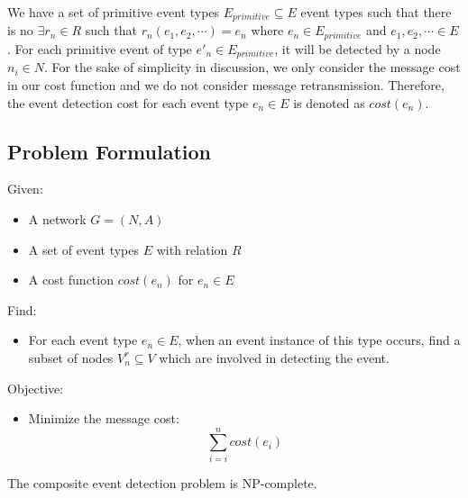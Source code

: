 We have a set of primitive event types \(E_{primitive}\subseteq E\) event types such that there is no \(\exists r_n\in R\) such that \(r_n(e_1, e_2, \cdots)=e_n\) where \(e_n\in E_{primitive}\) and \(e_1, e_2, \cdots \in E\). For each primitive event of type \(e'_n\in E_{primitive}\), it will be detected by a node \(n_i\in N\). For the sake of simplicity in discussion, we only consider the message cost in our cost function and we do not consider message retransmission. Therefore, the event detection cost for each event type \(e_n\in E\) is denoted as \(cost(e_n)\).

\subsection{Problem Formulation}
Given:
\begin{itemize}
	\item A network \(G=(N, A)\)
	\item A set of event types \(E\) with relation \(R\)
	\item A cost function \(cost(e_n)\) for \(e_n\in E\)
\end{itemize}

Find:
\begin{itemize}
	\item For each event type \(e_n\in E\), when an event instance of this type occurs, find a subset of nodes \(V_n^r\subseteq V\) which are involved in detecting the event.
\end{itemize}

Objective:
\begin{itemize}
	\item Minimize the message cost:
	\begin{displaymath}
	\sum_{i=i}^{n}cost(e_i)
	\end{displaymath}
\end{itemize}

\begin{theorem}
\label{thm:tableConstruction}
The composite event detection problem is NP-complete.
\end{theorem}

